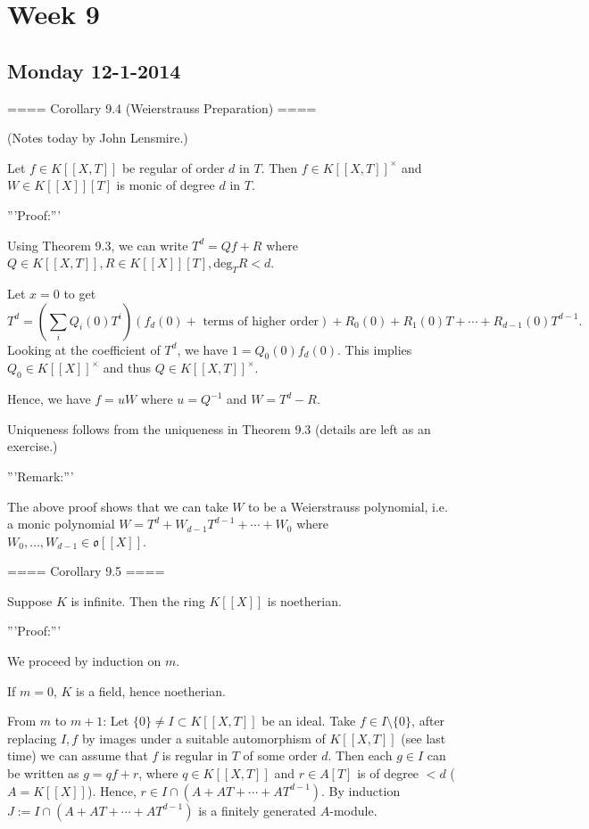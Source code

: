 \section{ Week 9 }

\subsection{ Monday 12-1-2014 }

==== Corollary 9.4 (Weierstrauss Preparation) ====

(Notes today by John Lensmire.)

Let $f\in K[[X,T]]$ be regular of order $d$ in $T$.
Then $f\in K[[X,T]]^\times$ and $W\in K[[X]][T]$ is monic of degree $d$ in $T$.

'''Proof:'''

Using Theorem 9.3, we can write $T^d = Qf+R$ where $Q\in K[[X,T]], R\in K[[X]][T], \mathrm{deg}_TR < d$.

Let $x=0$ to get
$$T^d = \left( \sum_i Q_i(0) T^i \right) (f_d(0) + \textrm{ terms of higher order} )
+ R_0(0) + R_1(0) T + \cdots + R_{d-1}(0) T^{d-1}.$$
Looking at the coefficient of $T^d$, we have $1 = Q_0(0) f_d(0)$.
This implies $Q_0 \in K[[X]]^\times$ and thus $Q\in K[[X,T]]^\times$.

Hence, we have $f = uW$ where $u = Q^{-1}$ and $W = T^d - R$.

Uniqueness follows from the uniqueness in Theorem 9.3 (details are left as an exercise.)

'''Remark:'''

The above proof shows that we can take $W$ to be a Weierstrauss polynomial, i.e. a monic polynomial
$W = T^d + W_{d-1} T^{d-1} + \cdots + W_0$ where $W_0,\ldots, W_{d-1}\in \mathfrak{o}[[X]]$.

==== Corollary 9.5 ====

Suppose $K$ is infinite. Then the ring $K[[X]]$ is noetherian.

'''Proof:'''

We proceed by induction on $m$.

If $m=0$, $K$ is a field, hence noetherian.

From $m$ to $m+1$:
Let $\{0\} \neq I \subset K[[X,T]]$ be an ideal.
Take $f\in I\setminus \{0\}$, after replacing $I,f$ by images under a suitable automorphism of $K[[X,T]]$
(see last time) we can assume that $f$ is regular in $T$ of some order $d$.
Then each $g\in I$ can be written as $g = qf + r$, where $q\in K[[X,T]]$ and $r\in A[T]$ is of degree $<d$ ($A = K[[X]]$).
Hence, $r\in I \cap (A + AT + \cdots + AT^{d-1})$. By induction $J:= I\cap (A + AT + \cdots + AT^{d-1})$ is a finitely generated $A$-module.

